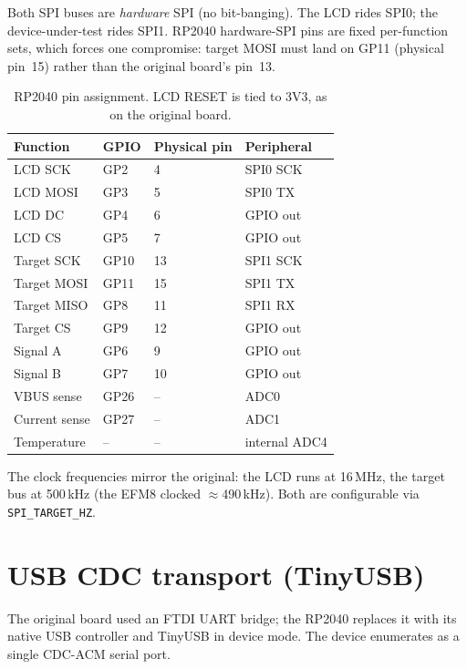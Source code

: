 \documentclass[11pt,a4paper]{article}
\begin{document}
Both SPI buses are \emph{hardware} SPI (no bit-banging). The LCD rides
SPI0; the device-under-test rides SPI1. RP2040 hardware-SPI pins are fixed
per-function sets, which forces one compromise: target MOSI must land on
GP11 (physical pin~15) rather than the original board's pin~13.

\begin{table}[h!]
\centering
\begin{tabular}{@{}llll@{}}
\toprule
\textbf{Function} & \textbf{GPIO} & \textbf{Physical pin} & \textbf{Peripheral}\\
\midrule
LCD SCK  & GP2  & 4  & SPI0 SCK \\
LCD MOSI & GP3  & 5  & SPI0 TX \\
LCD DC   & GP4  & 6  & GPIO out \\
LCD CS   & GP5  & 7  & GPIO out \\
\midrule
Target SCK  & GP10 & 13 & SPI1 SCK \\
Target MOSI & GP11 & 15 & SPI1 TX \\
Target MISO & GP8  & 11 & SPI1 RX \\
Target CS   & GP9  & 12 & GPIO out \\
\midrule
Signal A    & GP6  & 9  & GPIO out \\
Signal B    & GP7  & 10 & GPIO out \\
\midrule
VBUS sense  & GP26 & -- & ADC0 \\
Current sense & GP27 & -- & ADC1 \\
Temperature & --   & -- & internal ADC4 \\
\bottomrule
\end{tabular}
\caption{RP2040 pin assignment. LCD RESET is tied to 3V3, as on the original
  board.}
\label{tab:pins}
\end{table}

The clock frequencies mirror the original: the LCD runs at 16\,MHz, the
target bus at 500\,kHz (the EFM8 clocked $\approx$490\,kHz). Both are
configurable via \texttt{SPI\_TARGET\_HZ}.

\section{USB CDC transport (TinyUSB)}

The original board used an FTDI UART bridge; the RP2040 replaces it with its
native USB controller and TinyUSB in device mode. The device enumerates as a
single CDC-ACM serial port.
\end{document}
